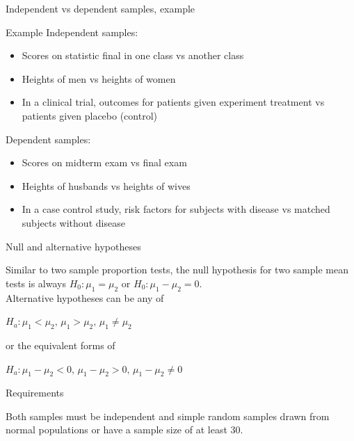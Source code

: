 \documentclass[xcolor=table]{beamer}
\begin{document}
\begin{frame}{Independent vs dependent samples, example}
\begin{exampleblock}{Example}
\large
Independent samples:
\begin{itemize}
\item Scores on statistic final in one class vs another class
\item Heights of men vs heights of women
\item In a clinical trial, outcomes for patients given experiment treatment vs patients given placebo (control)
\end{itemize}
\pause
Dependent samples:
\begin{itemize}
\item Scores on midterm exam vs final exam
\item Heights of husbands vs heights of wives
\item In a case control study, risk factors for subjects with disease vs matched subjects without disease
\end{itemize}
\end{exampleblock}
\end{frame}

\begin{frame}{Null and alternative hypotheses}
\begin{block}{}
\large
Similar to two sample proportion tests, the null hypothesis for two sample mean tests is always $H_0: \mu_1 = \mu_2$ or $H_0: \mu_1 -\mu_2 = 0$.\\
\medskip
Alternative hypotheses can be any of\\
\medskip
{\centering $H_a: \mu_1 < \mu_2, \, \mu_1 > \mu_2, \, \mu_1 \ne \mu_2$ \par}
\medskip
 or the equivalent forms of \\
 \medskip
{\centering $H_a: \mu_1 - \mu_2 < 0, \, \mu_1 - \mu_2 > 0, \, \mu_1 - \mu_2 \ne 0$ \par}
\medskip

\end{block}
\end{frame}

\begin{frame}{Requirements}
\begin{block}{}
\large
Both samples must be independent and simple random samples drawn from normal populations or have a sample size of at least 30.
\end{block}
\end{frame}
\end{document}
